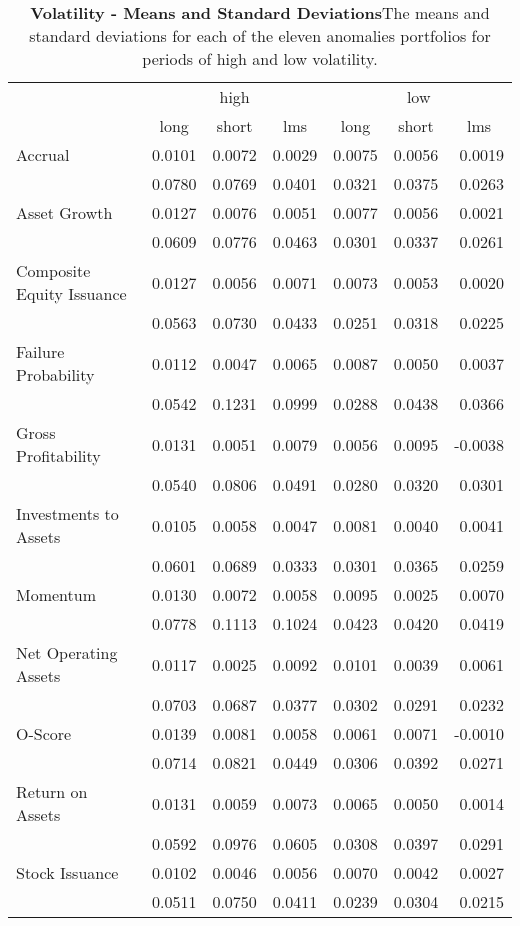 \begin{table}[hbt]
\centering
\scriptsize
\caption[VOL - Means and Standard Deviations]{\textbf{Volatility - Means and Standard Deviations}\newline The means and standard deviations for each of the eleven anomalies portfolios for periods of high and low volatility.}
\label{tab:Table 7}
\begin{tabular}{@{}lrrrrrr@{}}
\toprule
& \multicolumn{3}{c}{high} & \multicolumn{3}{c}{low} \\ \cmidrule(l){2-7} 
& \multicolumn{1}{c}{long} & \multicolumn{1}{c}{short} & \multicolumn{1}{c}{lms} & \multicolumn{1}{c}{long} & \multicolumn{1}{c}{short} & \multicolumn{1}{c}{lms} \\ \midrule
Accrual & 0.0101 & 0.0072 & 0.0029 & 0.0075 & 0.0056 & 0.0019 \\
& 0.0780 & 0.0769 & 0.0401 & 0.0321 & 0.0375 & 0.0263 \\
Asset Growth & 0.0127 & 0.0076 & 0.0051 & 0.0077 & 0.0056 & 0.0021 \\
& 0.0609 & 0.0776 & 0.0463 & 0.0301 & 0.0337 & 0.0261 \\
Composite Equity Issuance & 0.0127 & 0.0056 & 0.0071 & 0.0073 & 0.0053 & 0.0020 \\
& 0.0563 & 0.0730 & 0.0433 & 0.0251 & 0.0318 & 0.0225 \\
Failure Probability & 0.0112 & 0.0047 & 0.0065 & 0.0087 & 0.0050 & 0.0037 \\
& 0.0542 & 0.1231 & 0.0999 & 0.0288 & 0.0438 & 0.0366 \\
Gross Profitability & 0.0131 & 0.0051 & 0.0079 & 0.0056 & 0.0095 & -0.0038 \\
& 0.0540 & 0.0806 & 0.0491 & 0.0280 & 0.0320 & 0.0301 \\
Investments to Assets & 0.0105 & 0.0058 & 0.0047 & 0.0081 & 0.0040 & 0.0041 \\
& 0.0601 & 0.0689 & 0.0333 & 0.0301 & 0.0365 & 0.0259 \\
Momentum & 0.0130 & 0.0072 & 0.0058 & 0.0095 & 0.0025 & 0.0070 \\
& 0.0778 & 0.1113 & 0.1024 & 0.0423 & 0.0420 & 0.0419 \\
Net Operating Assets & 0.0117 & 0.0025 & 0.0092 & 0.0101 & 0.0039 & 0.0061 \\
& 0.0703 & 0.0687 & 0.0377 & 0.0302 & 0.0291 & 0.0232 \\
O-Score & 0.0139 & 0.0081 & 0.0058 & 0.0061 & 0.0071 & -0.0010 \\
& 0.0714 & 0.0821 & 0.0449 & 0.0306 & 0.0392 & 0.0271 \\
Return on Assets & 0.0131 & 0.0059 & 0.0073 & 0.0065 & 0.0050 & 0.0014 \\
& 0.0592 & 0.0976 & 0.0605 & 0.0308 & 0.0397 & 0.0291 \\
Stock Issuance & 0.0102 & 0.0046 & 0.0056 & 0.0070 & 0.0042 & 0.0027 \\
& 0.0511 & 0.0750 & 0.0411 & 0.0239 & 0.0304 & 0.0215 \\ \bottomrule
\end{tabular}%
\end{table}